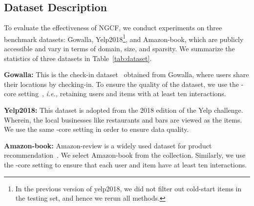 \documentclass[sigconf]{acmart}
\newcommand{\ie}{\emph{i.e., }}
\theoremstyle{definition}
\begin{document}
\begin{table}[t]
\caption{Statistics of the datasets.}
\vspace{-10px}
\label{tab:dataset}
\vspace{-15px}
\end{table}

\subsection{Dataset Description}
To evaluate the effectiveness of NGCF, we conduct experiments on three benchmark datasets: Gowalla, Yelp2018\footnote{In the previous version of yelp2018, we did not filter out cold-start items in the testing set, and hence we rerun all methods.}, and Amazon-book, which are publicly accessible and vary in terms of domain, size, and sparsity.
We summarize the statistics of three datasets in Table~\ref{tab:dataset}.

\vspace{2px}
\noindent\textbf{Gowalla:}
This is the check-in dataset~\cite{gowalla} obtained from Gowalla, where users share their locations by checking-in.
To ensure the quality of the dataset, we use the -core setting~\cite{VBPR}, \ie retaining users and items with at least ten interactions.

\vspace{2px}
\noindent\textbf{Yelp2018:}
This dataset is adopted from the 2018 edition of the Yelp challenge.
Wherein, the local businesses like restaurants and bars are viewed as the items.
We use the same -core setting in order to ensure data quality.

\vspace{2px}
\noindent\textbf{Amazon-book:}
Amazon-review is a widely used dataset for product recommendation~\cite{amazon-review}.
We select Amazon-book from the collection.
Similarly, we use the -core setting to ensure that each user and item have at least ten interactions.
\end{document}

